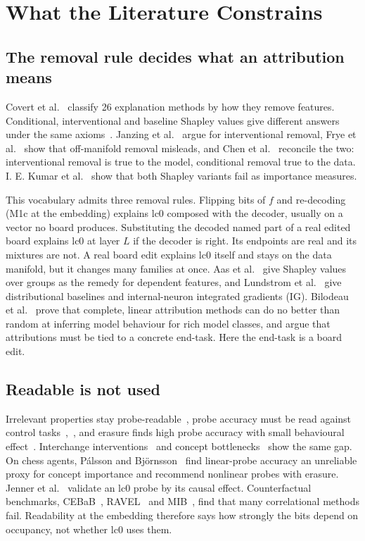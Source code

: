 \documentclass[conference]{IEEEtran}
\begin{document}
\section{What the Literature Constrains}\label{sec:4}
\subsection{The removal rule decides what an attribution means}\label{sec:4.1}
Covert et al.~\cite{covert2021} classify 26 explanation methods by how they remove features. Conditional, interventional and baseline Shapley values give different answers under the same axioms~\cite{sundararajan2020}. Janzing et al.~\cite{janzing2020} argue for interventional removal, Frye et al.~\cite{frye2021} show that off-manifold removal misleads, and Chen et al.~\cite{chen2020} reconcile the two: interventional removal is true to the model, conditional removal true to the data. I. E. Kumar et al.~\cite{kumarIE2020} show that both Shapley variants fail as importance measures.

This vocabulary admits three removal rules. Flipping bits of $f$ and re-decoding (M1c at the embedding) explains lc0 composed with the decoder, usually on a vector no board produces. Substituting the decoded named part of a real edited board explains lc0 at layer $L$ if the decoder is right. Its endpoints are real and its mixtures are not. A real board edit explains lc0 itself and stays on the data manifold, but it changes many families at once. Aas et al.~\cite{aas2021} give Shapley values over groups as the remedy for dependent features, and Lundstrom et al.~\cite{lundstrom2022} give distributional baselines and internal-neuron integrated gradients (IG). Bilodeau et al.~\cite{bilodeau2024} prove that complete, linear attribution methods can do no better than random at inferring model behaviour for rich model classes, and argue that attributions must be tied to a concrete end-task. Here the end-task is a board edit.

\subsection{Readable is not used}\label{sec:4.2}
Irrelevant properties stay probe-readable~\cite{ravichander2021}, probe accuracy must be read against control tasks~\cite{hewitt2019},~\cite{belinkov2022}, and erasure finds high probe accuracy with small behavioural effect~\cite{elazar2021}. Interchange interventions~\cite{geiger2020} and concept bottlenecks~\cite{margeloiu2021} show the same gap. On chess agents, Pálsson and Björnsson~\cite{palsson2024} find linear-probe accuracy an unreliable proxy for concept importance and recommend nonlinear probes with erasure. Jenner et al.~\cite{jenner2024} validate an lc0 probe by its causal effect. Counterfactual benchmarks, CEBaB~\cite{abraham2022}, RAVEL~\cite{huang2024} and MIB~\cite{mueller2025}, find that many correlational methods fail. Readability at the embedding therefore says how strongly the bits depend on occupancy, not whether lc0 uses them.
\end{document}
